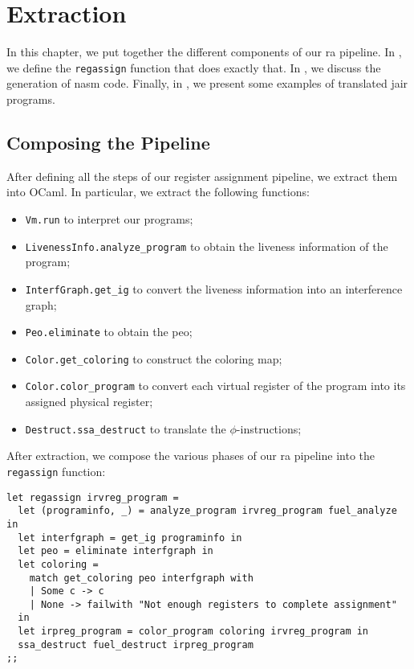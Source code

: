 
\chapter{Extraction}
\label{cha:extraction}

In this chapter, we put together the different components of our \gls{ra} pipeline. In , we define the \texttt{regassign} function that does exactly that. In , we discuss the generation of \gls{nasm} code. Finally, in , we present some examples of translated \gls{jair} programs.

\section{Composing the Pipeline}
\label{sec:pipeline}

After defining all the steps of our register assignment pipeline, we extract them into OCaml.
In particular, we extract the following functions:
\begin{itemize}
  \item \texttt{Vm.run} to interpret our programs;
  \item \texttt{LivenessInfo.analyze\_program} to obtain the liveness information of the program;
  \item \texttt{InterfGraph.get\_ig} to convert the liveness information into an interference graph;
  \item \texttt{Peo.eliminate} to obtain the \gls{peo};
  \item \texttt{Color.get\_coloring} to construct the coloring map;
  \item \texttt{Color.color\_program} to convert each virtual register of the program into its assigned physical register;
  \item \texttt{Destruct.ssa\_destruct} to translate the $\phi$-instructions;
\end{itemize}

After extraction, we compose the various phases of our \gls{ra} pipeline into the \texttt{regassign} function:

\begin{lstlisting}[style=OCaml]
let regassign irvreg_program =
  let (programinfo, _) = analyze_program irvreg_program fuel_analyze in
  let interfgraph = get_ig programinfo in
  let peo = eliminate interfgraph in
  let coloring =
    match get_coloring peo interfgraph with
    | Some c -> c
    | None -> failwith "Not enough registers to complete assignment"
  in
  let irpreg_program = color_program coloring irvreg_program in
  ssa_destruct fuel_destruct irpreg_program
;;
\end{lstlisting}

